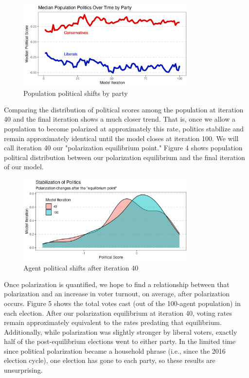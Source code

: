 \documentclass[titlepage, 12pt, leqno]{article} %
\begin{document}
\begin{figure}[ht]
    \centering
    \includegraphics[width=0.8\textwidth]{../plots/median_pop_pol.png}
    \caption{Population political shifts by party}
\end{figure}
\pagebreak

Comparing the distribution of political scores among the population at 
iteration 40 and the final iteration shows a much closer trend. That is, once 
we allow a population to become polarized at approximately this rate, politics
stabilize and remain approximately identical until the model closes at iteration
100. We will call iteration 40 our "polarization equilibrium point." Figure 4 
shows population political distribution between our polarization equilibrium
and the final iteration of our model.

\begin{figure}[ht]
    \centering
    \includegraphics[width=0.8\textwidth]{../plots/polarization_40.png}
    \caption{Agent political shifts after iteration 40}
\end{figure}

Once polarization is quantified, we hope to find a relationship between that
polarization and an increase in voter turnout, on average, after polarization
occurs. Figure 5 shows the total votes cast (out of the 100-agent population) in
each election. After our polarization equilibrium at iteration 40, voting rates
remain approximately equivalent to the rates predating that equilibrium.
Additionally, while polarization was slightly stronger by liberal voters, 
exactly half of the post-equilibrium elections went to either party. In the
limited time since political polarization became a household phrase (i.e., since
the 2016 election cycle), one election has gone to each party, so these results
are unsurprising.
\end{document}
